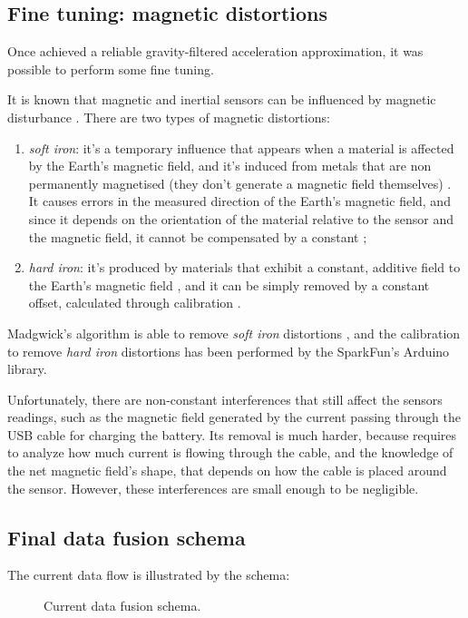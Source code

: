 \subsection{Fine tuning: magnetic distortions}
Once achieved a reliable gravity-filtered acceleration approximation, it was possible to perform some fine tuning.
\bigbreak

It is known that magnetic and inertial sensors can be influenced by magnetic disturbance \cite{Fan17}.
There are two types of magnetic distortions:
\begin{enumerate}
	\item \textit{soft iron}: it's a temporary influence that appears when a material is affected by the Earth's magnetic field, and it's induced from metals that are non permanently magnetised (they don't generate a magnetic field themselves) \cite{Cro15}. It causes errors in the measured direction of the Earth's magnetic field, and since it depends on the orientation of the material relative to the sensor and the magnetic field, it cannot be compensated by a constant \cite{CompensatingIron};
	\item \textit{hard iron}: it's produced by materials that exhibit a constant, additive field to the Earth's magnetic field \cite{CompensatingIron}, and it can be simply removed by a constant offset, calculated through calibration \cite{CompensatingIron, Geb06, Kok12}.
\end{enumerate}

Madgwick's algorithm is able to remove \textit{soft iron} distortions \cite[11-12]{Mad10}, and the calibration to remove \textit{hard iron} distortions has been performed by the SparkFun's Arduino library.
\bigbreak

Unfortunately, there are non-constant interferences that still affect the sensors readings, such as the magnetic field generated by the current passing through the USB cable for charging the battery.
Its removal is much harder, because requires to analyze how much current is flowing through the cable, and the knowledge of the net magnetic field's shape, that depends on how the cable is placed around the sensor. However, these interferences are small enough to be negligible.

\subsection{Final data fusion schema}
The current data flow is illustrated by the schema:

\begin{center}
	\begin{figure}[ht!]
		\caption{Current data fusion schema.}
	\end{figure}
\end{center}


